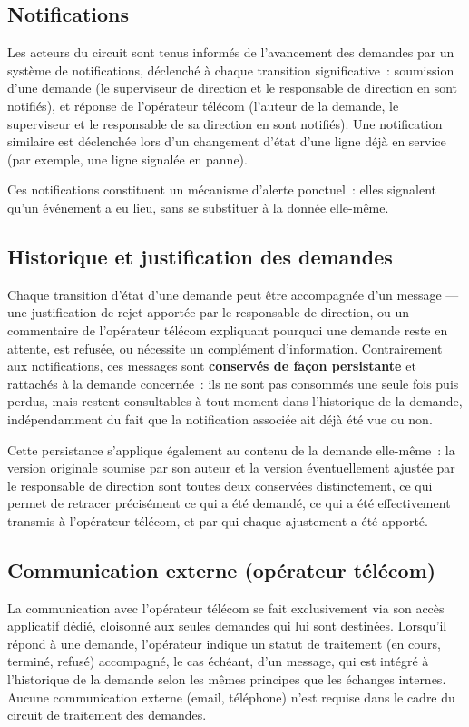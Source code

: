\documentclass[11pt,a4paper]{article}
\begin{document}
\subsection{Notifications}

Les acteurs du circuit sont tenus informés de l'avancement des demandes par un système de notifications, déclenché à chaque transition significative~: soumission d'une demande (le superviseur de direction et le responsable de direction en sont notifiés), et réponse de l'opérateur télécom (l'auteur de la demande, le superviseur et le responsable de sa direction en sont notifiés). Une notification similaire est déclenchée lors d'un changement d'état d'une ligne déjà en service (par exemple, une ligne signalée en panne).

Ces notifications constituent un mécanisme d'alerte ponctuel~: elles signalent qu'un événement a eu lieu, sans se substituer à la donnée elle-même.

\subsection{Historique et justification des demandes}

Chaque transition d'état d'une demande peut être accompagnée d'un message --- une justification de rejet apportée par le responsable de direction, ou un commentaire de l'opérateur télécom expliquant pourquoi une demande reste en attente, est refusée, ou nécessite un complément d'information. Contrairement aux notifications, ces messages sont \textbf{conservés de façon persistante} et rattachés à la demande concernée~: ils ne sont pas consommés une seule fois puis perdus, mais restent consultables à tout moment dans l'historique de la demande, indépendamment du fait que la notification associée ait déjà été vue ou non.

Cette persistance s'applique également au contenu de la demande elle-même~: la version originale soumise par son auteur et la version éventuellement ajustée par le responsable de direction sont toutes deux conservées distinctement, ce qui permet de retracer précisément ce qui a été demandé, ce qui a été effectivement transmis à l'opérateur télécom, et par qui chaque ajustement a été apporté.

\subsection{Communication externe (opérateur télécom)}

La communication avec l'opérateur télécom se fait exclusivement via son accès applicatif dédié, cloisonné aux seules demandes qui lui sont destinées. Lorsqu'il répond à une demande, l'opérateur indique un statut de traitement (en cours, terminé, refusé) accompagné, le cas échéant, d'un message, qui est intégré à l'historique de la demande selon les mêmes principes que les échanges internes. Aucune communication externe (email, téléphone) n'est requise dans le cadre du circuit de traitement des demandes.
\end{document}
